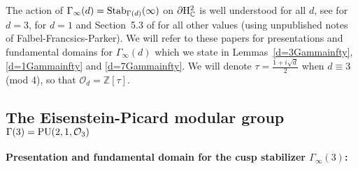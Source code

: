 \documentclass{article}[12pt]
\newcommand{\C}{\mathbb{C}}
\newcommand{\Z}{\mathbb{Z}}
\begin{document}
\medskip 

The action of $\Gamma_\infty(d)={\rm Stab}_{\Gamma(d)}(\infty)$ on $\partial {\rm H}^2_\C$ is well understood for all $d$, see \cite{FP} for $d=3$, \cite{FFP} for $d=1$ and Section~5.3 of \cite{PW} for all other values (using unpublished notes of Falbel-Francsics-Parker). We will refer to these papers for presentations and fundamental domains for  $\Gamma_\infty(d)$ which we state in Lemmas~\ref{d=3Gammainfty}, \ref{d=1Gammainfty} and \ref{d=7Gammainfty}. We will denote $\tau=\frac{1+i\sqrt{d}}{2}$ when $d \equiv 3$ (mod 4), so that $\mathcal{O}_d=\Z[\tau]$.

\subsection{The Eisenstein-Picard modular group $\Gamma(3)={\rm PU}(2,1,\mathcal{O}_3)$}


{\bf Presentation and fundamental domain for the cusp stabilizer $\Gamma_\infty(3)$:}
\end{document}
